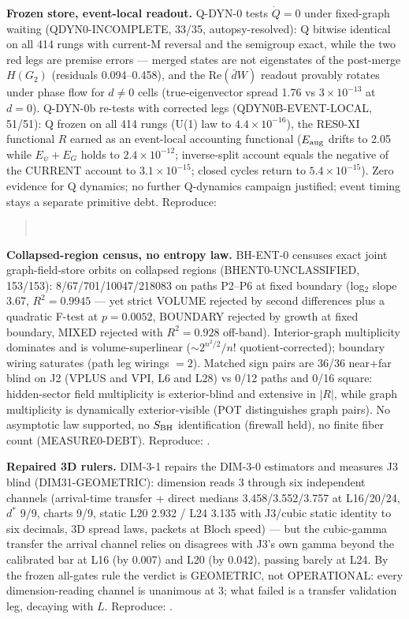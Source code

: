 \documentclass[11pt]{article}
\begin{document}
\textbf{Frozen store, event-local readout.} Q-DYN-0 tests $\dot Q = 0$ under
fixed-graph waiting (QDYN0-INCOMPLETE, 33/35, autopsy-resolved): Q bitwise
identical on all 414 rungs with current-M reversal and the semigroup exact,
while the two red legs are premise errors --- merged states are not
eigenstates of the post-merge $H(G_2)$ (residuals 0.094--0.458), and the
$\mathrm{Re}(\bar d W)$ readout provably rotates under phase flow for
$d \ne 0$ cells (true-eigenvector spread 1.76 vs $3\times10^{-13}$ at
$d = 0$). Q-DYN-0b re-tests with corrected legs (QDYN0B-EVENT-LOCAL, 51/51):
Q frozen on all 414 rungs (U(1) law to $4.4\times10^{-16}$), the RES0-XI
functional $R$ earned as an event-local accounting functional
($E_{\rm aug}$ drifts to 2.05 while $E_\psi + E_G$ holds to
$2.4\times10^{-12}$; inverse-split account equals the negative of the
CURRENT account to $3.1\times10^{-15}$; closed cycles return to
$5.4\times10^{-15}$). Zero evidence for Q dynamics; no further Q-dynamics
campaign justified; event timing stays a separate primitive debt.
Reproduce:
\begin{quote}\small
{}\\
\end{quote}

\textbf{Collapsed-region census, no entropy law.} BH-ENT-0 censuses exact
joint graph-field-store orbits on collapsed regions (BHENT0-UNCLASSIFIED,
153/153): 8/67/701/10047/218083 on paths P2--P6 at fixed boundary (log$_2$
slope 3.67, $R^2 = 0.9945$ --- yet strict VOLUME rejected by second
differences plus a quadratic F-test at $p = 0.0052$, BOUNDARY rejected by
growth at fixed boundary, MIXED rejected with $R^2 = 0.928$ off-band).
Interior-graph multiplicity dominates and is volume-superlinear
($\sim 2^{n^2/2}/n!$ quotient-corrected); boundary wiring saturates (path
leg wirings $= 2$). Matched sign pairs are 36/36 near+far blind on J2
(VPLUS and VPI, L6 and L28) vs 0/12 paths and 0/16 square: hidden-sector
field multiplicity is exterior-blind and extensive in $|R|$, while graph
multiplicity is dynamically exterior-visible (POT distinguishes graph
pairs). No asymptotic law supported, no $S_{\rm BH}$ identification
(firewall held), no finite fiber count (MEASURE0-DEBT).
Reproduce: .

\textbf{Repaired 3D rulers.} DIM-3-1 repairs the DIM-3-0 estimators and
measures J3 blind (DIM31-GEOMETRIC): dimension reads 3 through six
independent channels (arrival-time transfer + direct medians 3.458/3.552/3.757
at L16/20/24, $d^*$ 9/9, charts 9/9, static L20 2.932 / L24 3.135 with
J3/cubic static identity to six decimals, 3D spread laws, packets at Bloch
speed) --- but the cubic-gamma transfer the arrival channel relies on
disagrees with J3's own gamma beyond the calibrated bar at L16 (by 0.007)
and L20 (by 0.042), passing barely at L24. By the frozen all-gates rule the
verdict is GEOMETRIC, not OPERATIONAL: every dimension-reading channel is
unanimous at 3; what failed is a transfer validation leg, decaying with $L$.
Reproduce: .
\end{document}
